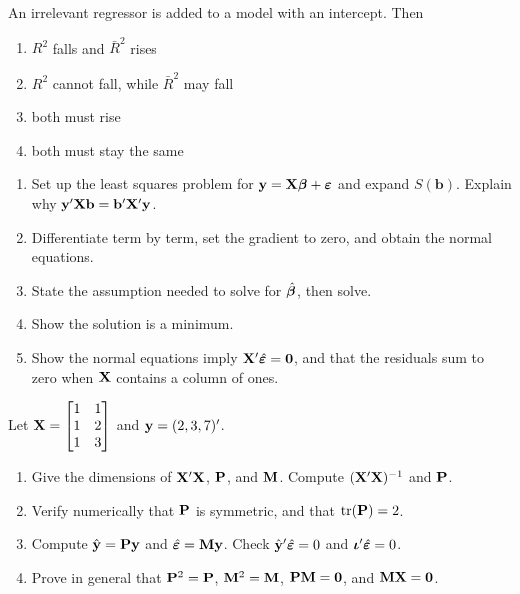 \documentclass[11pt]{article}
\begin{document}
An irrelevant regressor is added to a model with an intercept. Then
\begin{enumerate}[label=(\alph*)]
  \item $R^2$ falls and $\bar R^2$ rises
  \item $R^2$ cannot fall, while $\bar R^2$ may fall
  \item both must rise
  \item both must stay the same
\end{enumerate}

\begin{enumerate}[label=(\alph*)]
  \item Set up the least squares problem for $\mathbf{y}=\mathbf{X}\bm{\beta}+\bm{\varepsilon}$ and expand $S(\mathbf b)$. Explain why $\mathbf{y}'\mathbf{X}\mathbf b=\mathbf b'\mathbf{X}'\mathbf{y}$.
  \item Differentiate term by term, set the gradient to zero, and obtain the normal equations.
  \item State the assumption needed to solve for $\hat{\bm{\beta}}$, then solve.
  \item Show the solution is a minimum.
  \item Show the normal equations imply $\mathbf{X}'\hat{\bm{\varepsilon}}=\mathbf0$, and that the residuals sum to zero when $\mathbf{X}$ contains a column of ones.
\end{enumerate}

Let $\mathbf{X}=\begin{bmatrix}1&1\\1&2\\1&3\end{bmatrix}$ and $\mathbf{y}=(2,3,7)'$.
\begin{enumerate}[label=(\alph*)]
  \item Give the dimensions of $\mathbf{X}'\mathbf{X}$, $\mathbf{P}$, and $\mathbf{M}$. Compute $(\mathbf{X}'\mathbf{X})^{-1}$ and $\mathbf{P}$.
  \item Verify numerically that $\mathbf{P}$ is symmetric, and that $\operatorname{tr}(\mathbf{P})=2$.
  \item Compute $\hat{\mathbf{y}}=\mathbf{P}\mathbf{y}$ and $\hat{\bm{\varepsilon}}=\mathbf{M}\mathbf{y}$. Check $\hat{\mathbf{y}}'\hat{\bm{\varepsilon}}=0$ and $\bm{\iota}'\hat{\bm{\varepsilon}}=0$.
  \item Prove in general that $\mathbf{P}^2=\mathbf{P}$, $\mathbf{M}^2=\mathbf{M}$, $\mathbf{P}\mathbf{M}=\mathbf0$, and $\mathbf{M}\mathbf{X}=\mathbf0$.
\end{enumerate}
\end{document}
